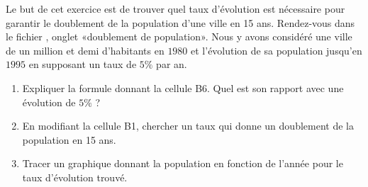 
\begin{exercice}\label{exosmath-0312}

    Le but de cet exercice est de trouver quel taux d'évolution est nécessaire pour garantir le doublement de la population d'une ville en 15 ans. Rendez-vous dans le fichier , onglet «doublement de population». Nous y avons considéré une ville de un million et demi d'habitants en $1980$ et l'évolution de sa population jusqu'en \( 1995\) en supposant un taux de \( 5\%\) par an.

    \begin{enumerate}
        \item
            Expliquer la formule donnant la cellule B6. Quel est son rapport avec une évolution de \( 5\%\) ?
        \item
            En modifiant la cellule B1, chercher un taux qui donne un doublement de la population en 15 ans.
        \item
            Tracer un graphique donnant la population en fonction de l'année pour le taux d'évolution trouvé.
    \end{enumerate}

\end{exercice}
